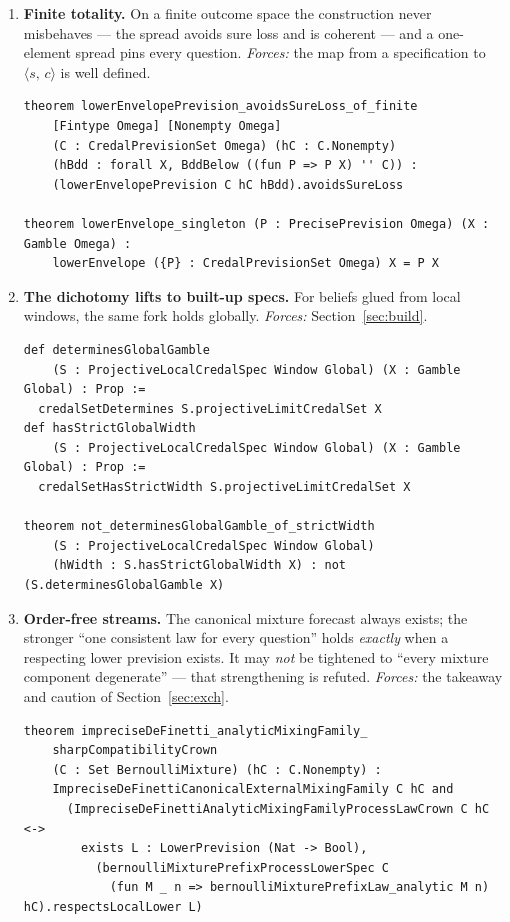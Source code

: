 \documentclass[]{article}
\newcommand{\STV}[2]{\langle #1,\, #2 \rangle}
\begin{document}
\begin{enumerate}
\item \textbf{Finite totality.} On a finite outcome space the construction never
misbehaves --- the spread avoids sure loss and is coherent --- and a one-element
spread pins every question. \emph{Forces:} the map from a specification to
$\STV{s}{c}$ is well defined.
\begin{lstlisting}
theorem lowerEnvelopePrevision_avoidsSureLoss_of_finite
    [Fintype Omega] [Nonempty Omega]
    (C : CredalPrevisionSet Omega) (hC : C.Nonempty)
    (hBdd : forall X, BddBelow ((fun P => P X) '' C)) :
    (lowerEnvelopePrevision C hC hBdd).avoidsSureLoss

theorem lowerEnvelope_singleton (P : PrecisePrevision Omega) (X : Gamble Omega) :
    lowerEnvelope ({P} : CredalPrevisionSet Omega) X = P X
\end{lstlisting}

\item\label{item:global} \textbf{The dichotomy lifts to built-up specs.} For
beliefs glued from local windows, the same fork holds globally. \emph{Forces:}
Section~\ref{sec:build}.
\begin{lstlisting}
def determinesGlobalGamble
    (S : ProjectiveLocalCredalSpec Window Global) (X : Gamble Global) : Prop :=
  credalSetDetermines S.projectiveLimitCredalSet X
def hasStrictGlobalWidth
    (S : ProjectiveLocalCredalSpec Window Global) (X : Gamble Global) : Prop :=
  credalSetHasStrictWidth S.projectiveLimitCredalSet X

theorem not_determinesGlobalGamble_of_strictWidth
    (S : ProjectiveLocalCredalSpec Window Global)
    (hWidth : S.hasStrictGlobalWidth X) : not (S.determinesGlobalGamble X)
\end{lstlisting}

\item\label{item:exch} \textbf{Order-free streams.} The canonical mixture
forecast always exists; the stronger ``one consistent law for every question''
holds \emph{exactly} when a respecting lower prevision exists. It may \emph{not}
be tightened to ``every mixture component degenerate'' --- that strengthening is
refuted. \emph{Forces:} the takeaway and caution of Section~\ref{sec:exch}.
\begin{lstlisting}
theorem impreciseDeFinetti_analyticMixingFamily_
    sharpCompatibilityCrown
    (C : Set BernoulliMixture) (hC : C.Nonempty) :
    ImpreciseDeFinettiCanonicalExternalMixingFamily C hC and
      (ImpreciseDeFinettiAnalyticMixingFamilyProcessLawCrown C hC <->
        exists L : LowerPrevision (Nat -> Bool),
          (bernoulliMixturePrefixProcessLowerSpec C
            (fun M _ n => bernoulliMixturePrefixLaw_analytic M n) hC).respectsLocalLower L)


\end{lstlisting}
\end{enumerate}
\end{document}

